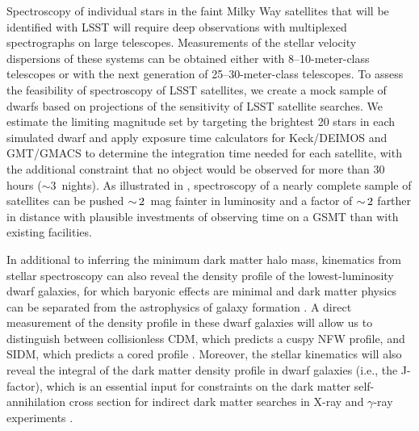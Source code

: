 Spectroscopy of individual stars in the faint Milky Way satellites that will be identified with LSST will require deep observations with multiplexed spectrographs on large telescopes.  Measurements of the stellar velocity dispersions of these systems can be obtained either with 8--10-meter-class telescopes or with the next generation of 25--30-meter-class telescopes.  To assess the feasibility of spectroscopy of LSST satellites, we create a mock sample of dwarfs based on projections of the sensitivity of LSST satellite searches. We estimate the limiting magnitude set by targeting the brightest 20 stars in each simulated dwarf and apply exposure time calculators for Keck/DEIMOS and GMT/GMACS to determine the integration time needed for each satellite, with the additional constraint that no object would be observed for more than 30 hours ($\sim3$~nights).
As illustrated in , spectroscopy of a nearly complete sample of satellites can be pushed $ {\sim}\, 2$~mag fainter in luminosity and a factor of $ {\sim}\, 2$ farther in distance with plausible investments of observing time on a GSMT than with existing facilities.

In additional to inferring the minimum dark matter halo mass, kinematics from stellar spectroscopy can also reveal the density profile of the lowest-luminosity dwarf galaxies, for which baryonic effects are minimal and dark matter physics can be separated from the astrophysics of galaxy formation \citep{governato2012,read2017}.  A direct measurement of the density profile in these dwarf galaxies will allow us to distinguish between collisionless CDM,  which predicts a cuspy NFW profile, and SIDM, which predicts a cored profile \citep{2012MNRAS.423.3740V,Rocha:2012jg}. Moreover, the stellar kinematics will also reveal the integral of the dark matter density profile in dwarf galaxies (i.e., the J-factor), which is an essential input for constraints on the dark matter self-annihilation cross section for indirect dark matter searches in X-ray and $\gamma$-ray experiments \citep[\eg,][]{1108.3546}.

